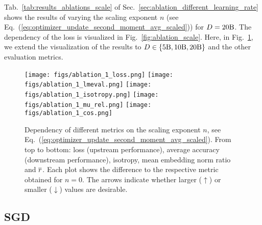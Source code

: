 Tab.~\ref{tab:results_ablations_scale} of 
Sec.~\ref{sec:ablation_different_learning_rate} shows the results of varying the scaling exponent $n$ (see Eq.~(\ref{eq:optimizer_update_second_moment_avg_scaled})) for $D = 20\rm B$. The dependency of the loss is visualized in Fig.~\ref{fig:ablation_scale}.
Here, in Fig.~\ref{fig:ablation_scale_complete}, we extend the visualization of the results to $D \in \{ 5\rm B, 10\rm B, 20\rm B \}$ and the other evaluation metrics.
\begin{figure*}[ht]
    \centering
    \texttt{[image: figs/ablation\_1\_loss.png]}
    \texttt{[image: figs/ablation\_1\_lmeval.png]}
    \texttt{[image: figs/ablation\_1\_isotropy.png]}
    \texttt{[image: figs/ablation\_1\_mu\_rel.png]}
    \texttt{[image: figs/ablation\_1\_cos.png]}
    \caption{Dependency of different metrics on the scaling exponent $n$, see Eq.~(\ref{eq:optimizer_update_second_moment_avg_scaled}). From top to bottom: loss (upstream performance), average accuracy (downstream performance), isotropy, mean embedding norm ratio and $\overline{r}$. Each plot shows the difference to the respective metric obtained for $n = 0$. The arrows indicate whether larger ($\uparrow$) or smaller ($\downarrow$) values are desirable.}
    \label{fig:ablation_scale_complete}
\end{figure*}

\subsection{SGD}
\label{app:additional_results_sgd}

